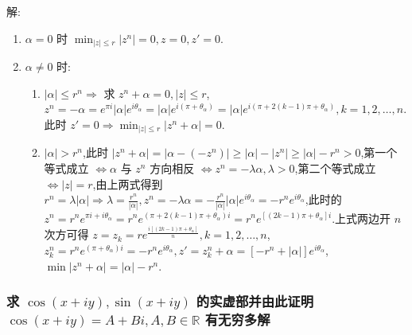 解:
\begin{enumerate}
    \item $\alpha=0$ 时 $\min_{|z|\le r}|z^{n}|=0,z=0,z'=0$.
    \item $\alpha\ne 0$ 时:
        \begin{enumerate}
            \item $|\alpha|\le r^{n}\Rightarrow $ 求 $z^{n}+\alpha=0,|z|\le r$, $z^{n}=-\alpha=e^{\pi i}|\alpha|e^{i\theta_{\alpha}}=|\alpha|e^{i\left( \pi+\theta_{\alpha} \right) }=|\alpha|e^{i\left( \pi+2\left( k-1 \right) \pi+\theta_{\alpha} \right) },k=1,2,\ldots,n$.此时 $z'=0\Rightarrow \min_{|z|\le r}|z^{n}+\alpha|=0$.
            \item $|\alpha|>r^{n}$,此时 $|z^{n}+\alpha|=|\alpha-\left( -z^{n} \right) |\ge |\alpha|-|z^{n}|\ge |\alpha|-r^{n}>0$,第一个等式成立 $\Leftrightarrow \alpha$ 与 $z^{n}$ 方向相反 $\Leftrightarrow z^{n}=-\lambda \alpha,\lambda >0$,第二个等式成立 $\Leftrightarrow |z|=r$,由上两式得到 $r^{n}=\lambda|\alpha|\Rightarrow \lambda=\frac{r^{n}}{|\alpha|},z^{n}=-\lambda \alpha=-\frac{r^{n}}{|\alpha|}|\alpha |e^{i \theta_{\alpha }}=-r^{n}e^{i \theta_{\alpha }}$,此时的 $z^{n}=r^{n}e^{\pi i+i \theta_{\alpha }}=r^{n}e^{\left( \pi +2\left( k-1 \right) \pi +\theta_{\alpha } \right) i}=r^{n}e^{\left[ \left( 2k-1 \right) \pi +\theta_{\alpha } \right]i}$.上式两边开 $n$ 次方可得 $z=z_{k}=re^{\frac{i\left[ \left( 2k-1 \right) \pi+\theta_{\alpha } \right]}{n}},k=1,2,\ldots,n$,$z_{k}^{n}=r^{n}e^{(\pi+\theta_{\alpha })i}=-r^{n}e^{i \theta_{\alpha }},z'=z_{k}^{n}+\alpha =\left[ -r^{n}+|\alpha | \right]e^{i \theta_{\alpha }}$, $\min |z^{n}+\alpha |=|\alpha |-r^{n}$.
        \end{enumerate}
\end{enumerate}

\subsubsection{求 $\cos \left( x+iy \right) ,\sin \left( x+iy \right) $ 的实虚部并由此证明 $\cos \left( x+iy \right) =A+Bi,A,B\in \mathbb{R}$ 有无穷多解}

